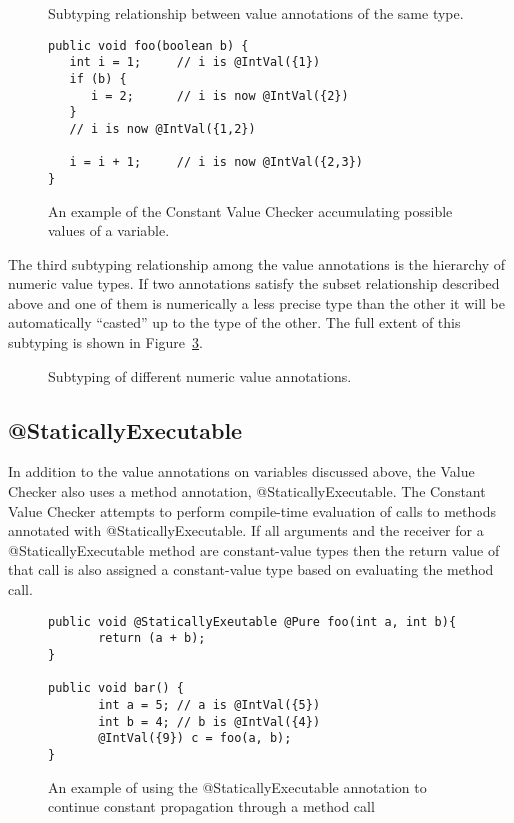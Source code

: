 \begin{figure}
\caption{Subtyping relationship between value annotations of the same type.}
\label{fig-value-subtype}
\end{figure}

\begin{figure}
\begin{Verbatim}
public void foo(boolean b) {
   int i = 1;     // i is @IntVal({1})
   if (b) {  
      i = 2;      // i is now @IntVal({2})
   }        
   // i is now @IntVal({1,2})
   
   i = i + 1;     // i is now @IntVal({2,3})
}
\end{Verbatim}
\caption{An example of the Constant Value Checker accumulating possible values
    of a variable.}
\label{fig-value-multivalue}
\end{figure}

The third subtyping relationship among the value annotations is the
hierarchy of numeric value types. If two annotations satisfy the
subset relationship described above and one of them is numerically a
less precise type than the other it will be automatically ``casted''
up to the type of the other. The full extent of this subtyping is
shown in Figure~\ref{fig-value-subtyping}.

\begin{figure}
\caption{Subtyping of different numeric value annotations.}
\label{fig-value-subtyping}
\end{figure}

\subsection{@StaticallyExecutable}
In addition to the value annotations on variables discussed above, the
Value Checker also uses a method annotation,
@StaticallyExecutable. The Constant Value Checker attempts to perform
compile-time evaluation of calls to methods annotated with
@StaticallyExecutable. If all arguments and the receiver for a
@StaticallyExecutable method are constant-value types then the return
value of that call is also assigned a constant-value type based on
evaluating the method call.

\begin{figure}
\begin{Verbatim}
public void @StaticallyExeutable @Pure foo(int a, int b){
       return (a + b);
}

public void bar() {
       int a = 5; // a is @IntVal({5})
       int b = 4; // b is @IntVal({4})
       @IntVal({9}) c = foo(a, b); 
}
\end{Verbatim}
\caption{An example of using the @StaticallyExecutable annotation to
       continue constant propagation through a method call}
\label{fig-value-multivalue}
\end{figure}

